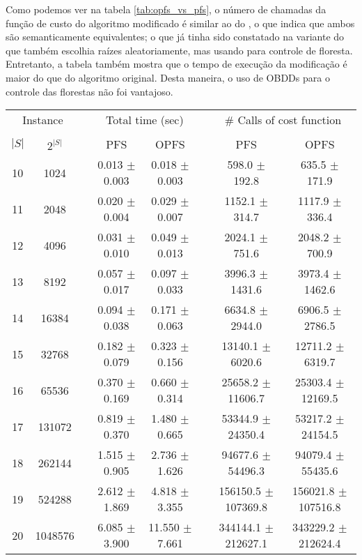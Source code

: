 Como podemos ver na tabela \ref{tab:opfs_vs_pfs}, o número de chamadas
da função de custo do algoritmo modificado é similar ao do 
, o que indica que ambos são semanticamente equivalentes; o 
que já tinha sido constatado na variante do  que também
escolhia raízes aleatoriamente, mas usando  para controle
de floresta. Entretanto, a tabela também mostra que o tempo de execução
da modificação é maior do que do algoritmo original. Desta maneira, o
uso de OBDDs para o controle das florestas não foi vantajoso.

\begin{table}
\centering
\footnotesize
\begin{tabular}{cc c cc c cc}
\toprule
\multicolumn{2}{c}{Instance} & \phantom{} & \multicolumn{2}{c}{Total time (sec)}  & \phantom{} & \multicolumn{2}{c}{\# Calls of cost function}\\
\cline{1-2}\cline{4-5}\cline{7-8}\\
$|S|$ & $2^{|S|}$ && PFS & OPFS && PFS & OPFS \\
10 &    1024 &&  0.013 $\pm$ 0.003 & 0.018 $\pm$ 0.003 &&  598.0 $\pm$ 192.8 & 635.5 $\pm$ 171.9 \\
11 &    2048 &&  0.020 $\pm$ 0.004 & 0.029 $\pm$ 0.007 &&  1152.1 $\pm$ 314.7 & 1117.9 $\pm$ 336.4 \\
12 &    4096 &&  0.031 $\pm$ 0.010 & 0.049 $\pm$ 0.013 &&  2024.1 $\pm$ 751.6 & 2048.2 $\pm$ 700.9 \\
13 &    8192 &&  0.057 $\pm$ 0.017 & 0.097 $\pm$ 0.033 &&  3996.3 $\pm$ 1431.6 & 3973.4 $\pm$ 1462.6 \\
14 &   16384 &&  0.094 $\pm$ 0.038 & 0.171 $\pm$ 0.063 &&  6634.8 $\pm$ 2944.0 & 6906.5 $\pm$ 2786.5 \\
15 &   32768 &&  0.182 $\pm$ 0.079 & 0.323 $\pm$ 0.156 &&  13140.1 $\pm$ 6020.6 & 12711.2 $\pm$ 6319.7 \\
16 &   65536 &&  0.370 $\pm$ 0.169 & 0.660 $\pm$ 0.314 &&  25658.2 $\pm$ 11606.7 & 25303.4 $\pm$ 12169.5 \\
17 &  131072 &&  0.819 $\pm$ 0.370 & 1.480 $\pm$ 0.665 &&  53344.9 $\pm$ 24350.4 & 53217.2 $\pm$ 24154.5 \\
18 &  262144 &&  1.515 $\pm$ 0.905 & 2.736 $\pm$ 1.626 &&  94677.6 $\pm$ 54496.3 & 94079.4 $\pm$ 55435.6 \\
19 &  524288 &&  2.612 $\pm$ 1.869 & 4.818 $\pm$ 3.355 &&  156150.5 $\pm$ 107369.8 & 156021.8 $\pm$ 107516.8 \\
20 & 1048576 &&  6.085 $\pm$ 3.900 & 11.550 $\pm$ 7.661 &&  344144.1 $\pm$ 212627.1 & 343229.2 $\pm$ 212624.4 \\

\end{tabular}
\end{table}
